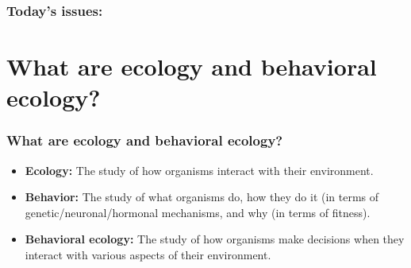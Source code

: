 \begin{noheadline}
\begin{frame}
\frametitle{Today's issues:}
\vspace{5mm}
\tableofcontents
\end{frame}
\end{noheadline}

\section[What are ecology and behavioral ecology?]{What are ecology and
    behavioral ecology?}

\begin{noheadline}
\begin{frame}[t]
    \frametitle{What are ecology and behavioral ecology?}
    \begin{adjustwidth}{-2em}{-1.5em}

        \begin{itemize}
            \item \textbf{Ecology:} The study of how organisms interact with
                their environment.

                \vspace{4mm}
            \item \textbf{Behavior:} The study of what organisms do, how they
                do it (in terms of genetic/neuronal/hormonal mechanisms,
                and why (in terms of fitness).

                \vspace{4mm}
            \item \textbf{Behavioral ecology:} The study of how organisms
                make decisions when they interact with various aspects of
                their environment.
        \end{itemize}
    \end{adjustwidth}
\end{frame}
\end{noheadline}

